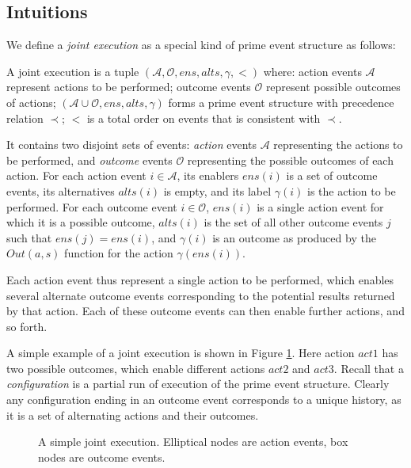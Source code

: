 \subsection{Intuitions}

We define a \emph{joint execution} as a special kind of prime event
structure as follows:

\begin{defnL}
 A joint execution is a tuple $(\mathcal{A},\mathcal{O},ens,alts,\gamma,<)$
where:\emph{ }action events $\mathcal{A}$ represent actions to be
performed; outcome\emph{ }events $\mathcal{O}$ represent possible
outcomes of actions; $(\mathcal{A}\cup\mathcal{O},ens,alts,\gamma)$
forms a prime event structure with precedence relation $\prec$; $<$
is a total order on events that is consistent with $\prec$.
\end{defnL}
It contains two disjoint sets of events: \emph{action} events $\mathcal{A}$
representing the actions to be performed, and \emph{outcome} events
$\mathcal{O}$ representing the possible outcomes of each action.
For each action event $i\in\mathcal{A}$, its enablers $ens(i)$ is
a set of outcome events, its alternatives $alts(i)$ is empty, and
its label $\gamma(i)$ is the action to be performed. For each outcome
event $i\in\mathcal{O}$, $ens(i)$ is a single action event for which
it is a possible outcome, $alts(i)$ is the set of all other outcome
events $j$ such that $ens(j)=ens(i)$, and $\gamma(i)$ is an outcome
as produced by the $Out(a,s)$ function for the action $\gamma(ens(i))$.

Each action event thus represent a single action to be performed,
which enables several alternate outcome events corresponding to the
potential results returned by that action. Each of these outcome events
can then enable further actions, and so forth.

A simple example of a joint execution is shown in Figure \ref{fig:example-je}.
Here action $act1$ has two possible outcomes, which enable different
actions $act2$ and $act3$. Recall that a \emph{configuration} is
a partial run of execution of the prime event structure. Clearly any
configuration ending in an outcome event corresponds to a unique history,
as it is a set of alternating actions and their outcomes.

%
\begin{figure}

\caption{ A simple joint execution. Elliptical nodes are action events, box
nodes are outcome events. }


\label{fig:example-je} 
\end{figure}


